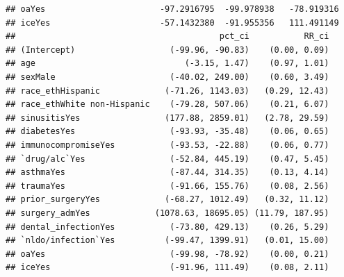 \documentclass[
]{article}
\begin{document}
\begin{verbatim}
## oaYes                       -97.2916795  -99.978938   -78.919316
## iceYes                      -57.1432380  -91.955356   111.491149
##                                         pct_ci           RR_ci
## (Intercept)                   (-99.96, -90.83)    (0.00, 0.09)
## age                              (-3.15, 1.47)    (0.97, 1.01)
## sexMale                       (-40.02, 249.00)    (0.60, 3.49)
## race_ethHispanic             (-71.26, 1143.03)   (0.29, 12.43)
## race_ethWhite non-Hispanic    (-79.28, 507.06)    (0.21, 6.07)
## sinusitisYes                 (177.88, 2859.01)   (2.78, 29.59)
## diabetesYes                   (-93.93, -35.48)    (0.06, 0.65)
## immunocompromiseYes           (-93.53, -22.88)    (0.06, 0.77)
## `drug/alc`Yes                 (-52.84, 445.19)    (0.47, 5.45)
## asthmaYes                     (-87.44, 314.35)    (0.13, 4.14)
## traumaYes                     (-91.66, 155.76)    (0.08, 2.56)
## prior_surgeryYes             (-68.27, 1012.49)   (0.32, 11.12)
## surgery_admYes             (1078.63, 18695.05) (11.79, 187.95)
## dental_infectionYes           (-73.80, 429.13)    (0.26, 5.29)
## `nldo/infection`Yes          (-99.47, 1399.91)   (0.01, 15.00)
## oaYes                         (-99.98, -78.92)    (0.00, 0.21)
## iceYes                        (-91.96, 111.49)    (0.08, 2.11)
\end{verbatim}
\end{document}
